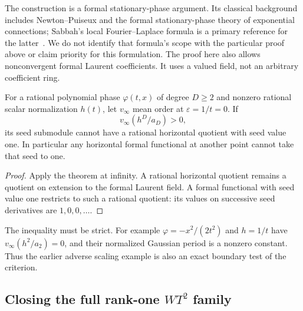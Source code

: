 The construction is a formal stationary-phase argument. Its classical
background includes Newton--Puiseux and the formal stationary-phase
theory of exponential connections; Sabbah's local Fourier--Laplace
formula is a primary reference for the latter~\cite{SabbahStationary}.
We do not identify that formula's scope with the particular proof
above or claim priority for this formulation. The proof here also
allows nonconvergent formal Laurent coefficients. It uses a valued
field, not an arbitrary coefficient ring.

\begin{corollary}\label{cor:leadingobstruction}
For a rational polynomial phase $\varphi(t,x)$ of degree $D\geq2$
and nonzero rational scalar normalization $h(t)$, let $v_\infty$
mean order at $\varepsilon=1/t=0$. If
\begin{equation}\label{eq:leadingcriterion}
 v_\infty(h^D/a_D)>0,
\end{equation}
its seed submodule cannot have a rational horizontal quotient with
seed value one. In particular any horizontal formal functional at
another point cannot take that seed to one.
\end{corollary}
\begin{proof}
Apply the theorem at infinity. A rational horizontal quotient remains
a quotient on extension to the formal Laurent field. A formal
functional with seed value one restricts to such a rational quotient:
its values on successive seed derivatives are $1,0,0,\ldots$.
\end{proof}

The inequality must be strict. For example
$\varphi=-x^2/(2t^2)$ and $h=1/t$ have
$v_\infty(h^2/a_2)=0$, and their normalized Gaussian period is a
nonzero constant. Thus the earlier adverse scaling example is also
an exact boundary test of the criterion.

\subsection{Closing the full rank-one $WT^2$ family}\label{sec:rankoneformal}

